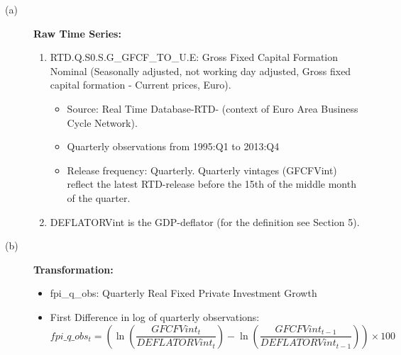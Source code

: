 \documentclass[3p,review,times]{elsarticle}		%
\begin{document}
\begin{description}
	\item[(a)] \textbf{Raw Time Series:} 
	\begin{enumerate}
		\item RTD.Q.S0.S.G\_GFCF\_TO\_U.E: Gross Fixed Capital Formation Nominal (Seasonally adjusted, not working day adjusted, Gross fixed capital formation - Current prices, Euro).
		\begin{itemize}
			\item Source: Real Time Database-RTD- (context of Euro Area Business Cycle Network).
			\item Quarterly observations from 1995:Q1 to 2013:Q4 
			\item Release frequency: Quarterly. Quarterly vintages (GFCFVint) reflect the latest RTD-release before the 15th of the middle month of the quarter. 
		\end{itemize}
		\item DEFLATORVint  is the GDP-deflator (for the definition see Section 5).
	\end{enumerate}
	\item[(b)] \textbf{Transformation:}
	\begin{itemize}
		\item fpi\_q\_obs: Quarterly Real Fixed Private Investment Growth
		\item First Difference in log of quarterly observations:
		$$fpi\_q\_obs_{t}=\left(\ln\left(\frac{GFCFVint_t}{DEFLATORVint_t}\right)-\ln\left(\frac{GFCFVint_{t-1}}{DEFLATORVint_{t-1}}\right)\right)\times 100$$
	\end{itemize}
\end{description}
\end{document}
